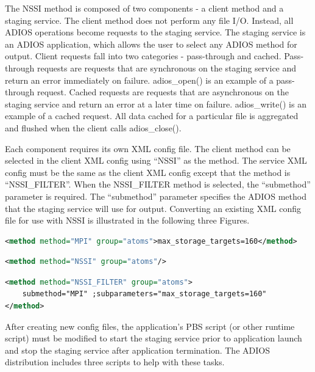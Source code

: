 The NSSI method is composed of two components - a client method and a staging service. 
 The client method does not perform any file I/O.  Instead, all ADIOS operations 
become requests to the staging service.  The staging service is an ADIOS application, 
which allows the user to select any ADIOS method for output.  Client requests fall 
into two categories - pass-through and cached.  Pass-through requests are requests 
that are synchronous on the staging service and return an error immediately on 
failure.  adios\_open() is an example of a pass-through request.  Cached requests 
are requests that are asynchronous on the staging service and return an error at 
a later time on failure.  adios\_write() is an example of a cached request.  All 
data cached for a particular file is aggregated and flushed when the client calls 
adios\_close().

Each component requires its own XML config file.  The client method can be selected 
in the client XML config using ``NSSI'' as the method.  The service XML config 
must be the same as the client XML config except that the method is ``NSSI\_FILTER''. 
 When the NSSI\_FILTER method is selected, the ``submethod'' parameter is required. 
 The ``submethod'' parameter specifies the ADIOS method that the staging service 
will use for output.  Converting an existing XML config file for use with NSSI 
is illustrated in the following three Figures.

\begin{lstlisting}[language=XML, caption=Example Original Client XML]
<method method="MPI" group="atoms">max_storage_targets=160</method>
\end{lstlisting}

\begin{lstlisting}[language=XML, caption=Example NSSI Client XML]
<method method="NSSI" group="atoms"/>
\end{lstlisting}

\begin{lstlisting}[language=XML, caption=Example NSSI Staging Service XML]
<method method="NSSI_FILTER" group="atoms"> 
	submethod="MPI" ;subparameters="max_storage_targets=160"
</method>
\end{lstlisting}

After creating new config files, the application's PBS script (or other runtime 
script) must be modified to start the staging service prior to application launch 
and stop the staging service after application termination. The ADIOS distribution 
includes three scripts to help with these tasks.

